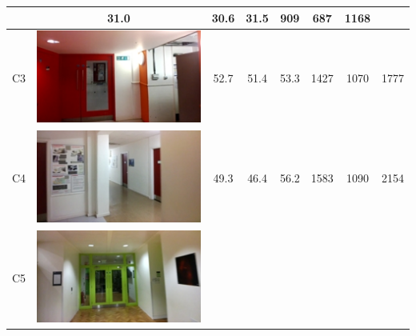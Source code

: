 \begin{table}[ht]
\begin{center}
\begin{tabular}{l c c c c c c c}
         & 31.0  & 30.6 & 31.5 & 909          & 687  & 1168 \\ \hline
    C3       & \begin{minipage}{.1\textwidth}
      			\includegraphics[width=\linewidth]{./gfx/Chapter04/table/3.jpg}
			   \end{minipage}
			        & 52.7  & 51.4 & 53.3 & 1427         & 1070 & 1777 \\ \hline
    C4       & \begin{minipage}{.1\textwidth}
      			\includegraphics[width=\linewidth]{./gfx/Chapter04/table/4.jpg}
			   \end{minipage}
			        & 49.3  & 46.4 & 56.2 & 1583         & 1090 & 2154 \\ \hline
    C5       & \begin{minipage}{.1\textwidth}
      			\includegraphics[width=\linewidth]{./gfx/Chapter04/table/5.jpg}

\end{minipage}
\end{tabular}
\end{center}
\end{table}
